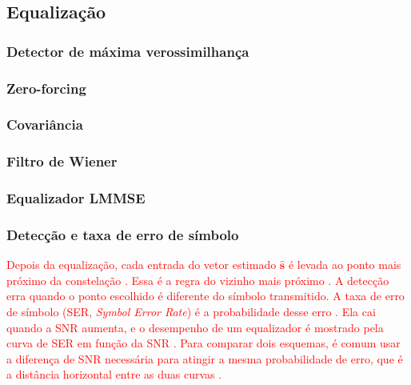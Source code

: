 \subsection{Equalização}\label{subsec:equalization}


\subsubsection{Detector de máxima verossimilhança}
\subsubsection{Zero-forcing}
\subsubsection{Covariância}
\subsubsection{Filtro de Wiener}
\subsubsection{Equalizador LMMSE}
\subsubsection{Detecção e taxa de erro de símbolo}\label{subsubsec:ser}
\textcolor{red}{Depois da equalização, cada entrada do vetor estimado $\hat{\mathbf{s}}$ é levada ao ponto mais próximo da constelação \cite{zhao2025jsac}. Essa é a regra do vizinho mais próximo \cite[p.~503]{tse-viswanath}. A detecção erra quando o ponto escolhido é diferente do símbolo transmitido. A taxa de erro de símbolo (SER, \textit{Symbol Error Rate}) é a probabilidade desse erro \cite[p.~503]{tse-viswanath}. Ela cai quando a SNR aumenta, e o desempenho de um equalizador é mostrado pela curva de SER em função da SNR \cite{zhao2025jsac}. Para comparar dois esquemas, é comum usar a diferença de SNR necessária para atingir a mesma probabilidade de erro, que é a distância horizontal entre as duas curvas \cite[p.~55]{tse-viswanath}.}
